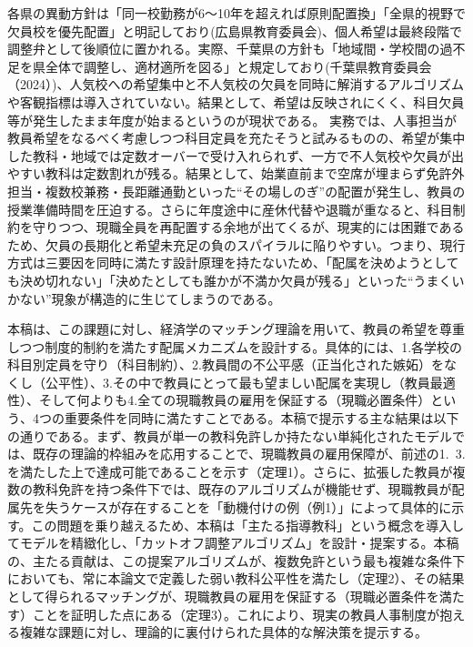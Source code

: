 \documentclass[12pt, a4paper]{article}
\theoremstyle{definition}
\theoremstyle{remark}
\theoremstyle{plain}
\begin{document}
各県の異動方針は「同一校勤務が6～10年を超えれば原則配置換」「全県的視野で欠員校を優先配置」と明記しており(広島県教育委員会)、個人希望は最終段階で調整弁として後順位に置かれる。実際、千葉県の方針も「地域間・学校間の過不足を県全体で調整し、適材適所を図る」と規定しており(千葉県教育委員会（2024）)、人気校への希望集中と不人気校の欠員を同時に解消するアルゴリズムや客観指標は導入されていない。結果として、希望は反映されにくく、科目欠員等が発生したまま年度が始まるというのが現状である。
実務では、人事担当が教員希望をなるべく考慮しつつ科目定員を充たそうと試みるものの、希望が集中した教科・地域では定数オーバーで受け入れられず、一方で不人気校や欠員が出やすい教科は定数割れが残る。結果として、始業直前まで空席が埋まらず免許外担当・複数校兼務・長距離通勤といった“その場しのぎ”の配置が発生し、教員の授業準備時間を圧迫する。さらに年度途中に産休代替や退職が重なると、科目制約を守りつつ、現職全員を再配置する余地が出てくるが、現実的には困難であるため、欠員の長期化と希望未充足の負のスパイラルに陥りやすい。つまり、現行方式は三要因を同時に満たす設計原理を持たないため、「配属を決めようとしても決め切れない」「決めたとしても誰かが不満か欠員が残る」といった“うまくいかない”現象が構造的に生じてしまうのである。

本稿は、この課題に対し、経済学のマッチング理論を用いて、教員の希望を尊重しつつ制度的制約を満たす配属メカニズムを設計する。具体的には、1.各学校の科目別定員を守り（科目制約）、2.教員間の不公平感（正当化された嫉妬）をなくし（公平性）、3.その中で教員にとって最も望ましい配属を実現し（教員最適性）、そして何よりも4.全ての現職教員の雇用を保証する（現職必置条件）という、4つの重要条件を同時に満たすことである。本稿で提示する主な結果は以下の通りである。まず、教員が単一の教科免許しか持たない単純化されたモデルでは、既存の理論的枠組みを応用することで、現職教員の雇用保障が、前述の1.~3.を満たした上で達成可能であることを示す（定理1）。さらに、拡張した教員が複数の教科免許を持つ条件下では、既存のアルゴリズムが機能せず、現職教員が配属先を失うケースが存在することを「動機付けの例（例1）」によって具体的に示す。この問題を乗り越えるため、本稿は「主たる指導教科」という概念を導入してモデルを精緻化し、「カットオフ調整アルゴリズム」を設計・提案する。本稿の、主たる貢献は、この提案アルゴリズムが、複数免許という最も複雑な条件下においても、常に本論文で定義した弱い教科公平性を満たし（定理2）、その結果として得られるマッチングが、現職教員の雇用を保証する（現職必置条件を満たす）ことを証明した点にある（定理3）。これにより、現実の教員人事制度が抱える複雑な課題に対し、理論的に裏付けられた具体的な解決策を提示する。
\end{document}
